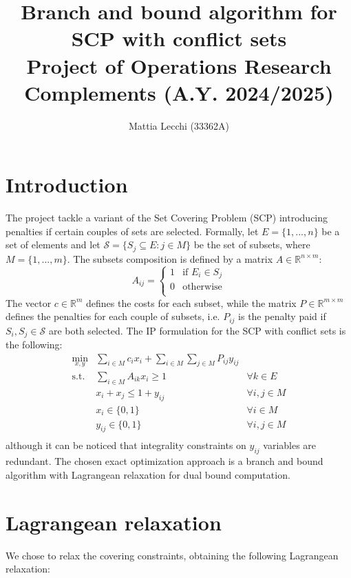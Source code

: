 \documentclass[a4paper]{article}
\author{Mattia Lecchi (33362A)}
\title{Branch and bound algorithm for SCP with conflict sets\\ 
	\large Project of Operations Research Complements (A.Y. 2024/2025)}
\begin{document}
	\maketitle
	
\section{Introduction}

The project tackle a variant of the Set Covering Problem (SCP) introducing penalties if certain couples of sets are selected. Formally, let $E=\{1,...,n\}$ be a set of elements and let $\mathcal S=\{S_j\subseteq E : j \in M\}$ be the set of subsets, where $M=\{1,...,m\}$. 
The subsets composition is defined by a matrix $A \in \mathbb R^{n\times m}$:
$$
A_{ij} =
\begin{cases}
	1& \text{if } E_i \in S_j\\
	0& \text{otherwise}\\
\end{cases}
$$
The vector $c \in \mathbb R^{m}$ defines the costs for each subset, while the matrix $P \in \mathbb R^{m\times m}$ defines the penalties for each couple of subsets, i.e. $P_{ij}$ is the penalty paid if $S_i,S_j\in \mathcal S$ are both selected.
The IP formulation for the SCP with conflict sets is the following:
\begin{align*}
	\min_{x,y} & \sum_{i\in M} c_i x_i + \sum_{i \in M} \sum_{j \in M} P_{ij} y_{ij} & \\
	\text{s.t. } 
	& \sum_{i\in M} A_{ik} x_i \ge 1 & \forall k \in E \\
	& x_i + x_j \le 1 + y_{ij} & \forall i,j \in M \\
	& x_i \in \{0, 1\} & \forall i \in M \\
	& y_{ij} \in \{0, 1\} & \forall i,j \in M\\
\end{align*}
although it can be noticed that integrality constraints on $y_{ij}$ variables are redundant.
The chosen exact optimization approach is a branch and bound algorithm with Lagrangean relaxation for dual bound computation.

\section{Lagrangean relaxation}

We chose to relax the covering constraints, obtaining the following Lagrangean relaxation:
\end{document}
